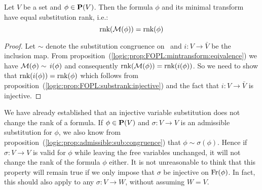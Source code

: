 \begin{prop}\label{logic:prop:FOPL:substrank:minrank}
Let $V$ be a set and $\phi\in\mbox{${\bf P}(V)$}$. Then the formula $\phi$ and its
minimal transform have equal substitution rank, i.e.:
    \[
    \mbox{\rm rnk}({\cal M}(\phi))=\mbox{\rm rnk}(\phi)
    \]
\end{prop}
\begin{proof}
Let $\sim$ denote the substitution congruence on \pvb\ and
$i:V\to\bar{V}$ be the inclusion map. From
proposition~(\ref{logic:prop:FOPL:mintransform:eqivalence}) we have
${\cal M}(\phi)\sim\, i(\phi)$ and consequently $\mbox{\rm rnk}({\cal
M}(\phi))=\mbox{\rm rnk}(i(\phi))$. So we need to show that
$\mbox{\rm rnk}(i(\phi))=\mbox{\rm rnk}(\phi)$ which follows from
proposition~(\ref{logic:prop:FOPL:substrank:injective}) and the fact
that $i:V\to\bar{V}$ is injective.
\end{proof}

We have already established that an injective variable substitution
does not change the rank of a formula. If $\phi\in\mbox{${\bf P}(V)$}$ and
$\sigma:V\to V$ is an admissible substitution for $\phi$, we also
know from proposition~(\ref{logic:prop:admissible:sub:congruence})
that $\phi\sim\sigma(\phi)$. Hence if $\sigma:V\to V$ is valid for
$\phi$ while leaving the free variables unchanged, it will not
change the rank of the formula $\phi$ either. It is not unreasonable
to think that this property will remain true if we only impose that
$\sigma$ be injective on $\mbox{\rm Fr}(\phi)$. In fact, this should also
apply to any $\sigma:V\to W$, without assuming $W=V$.

